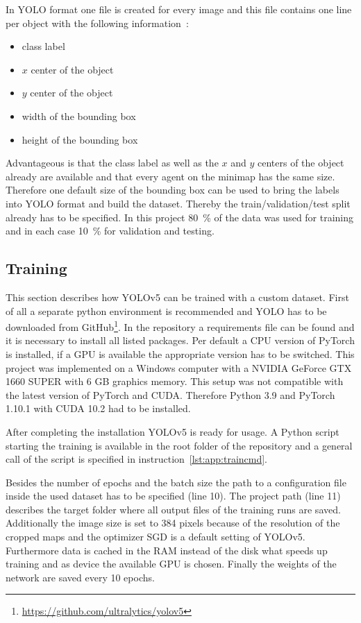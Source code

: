 In YOLO format one file is created for every image and this file contains one line per object with the 
following information~\cite{yoloLabels}:

\begin{itemize}
	\item class label
	\item $x$ center of the object
	\item $y$ center of the object
	\item width of the bounding box
	\item height of the bounding box
\end{itemize}

Advantageous is that the class label as well as the $x$ and $y$ centers of the object already are 
available and that every agent on the minimap has the same size. Therefore one default size of the 
bounding box can be used to bring the labels into YOLO format and build the dataset. Thereby the 
train/validation/test split already has to be specified. In this project 80~\% of the data was used for 
training and in each case 10~\% for validation and testing.

\subsection{Training}\label{subsec:app:training}

This section describes how YOLOv5 can be trained with a custom dataset. First of all a separate 
python environment is recommended and YOLO has to be downloaded from 
GitHub\footnote{\url{https://github.com/ultralytics/yolov5}}.  In the repository a requirements file can 
be found and it is necessary to install all listed packages. Per default a CPU version of PyTorch is 
installed, if a GPU is available the appropriate version has to be switched. This project was 
implemented on a Windows computer with a NVIDIA GeForce GTX 1660 SUPER with 6 GB graphics 
memory. This setup was not compatible with the latest version of PyTorch and CUDA. Therefore 
Python 3.9 and PyTorch 1.10.1 with CUDA 10.2 had to be installed.

After completing the installation YOLOv5 is ready for usage. A Python script starting the training is 
available in the root folder of the repository and a general call of the script is specified in 
instruction~\ref{lst:app:traincmd}. 

Besides the number of epochs and the batch size the path to a configuration file inside the used 
dataset has to be specified (line 10). The project path (line 11) describes the target folder where all 
output files of the training runs are saved. Additionally the image size is set to 384 pixels because of 
the resolution of the cropped maps and the optimizer SGD is a default setting of YOLOv5. 
Furthermore data is cached in the RAM instead of the disk what speeds up training and as device the 
available GPU is chosen. Finally the weights of the network are saved every 10 epochs.


